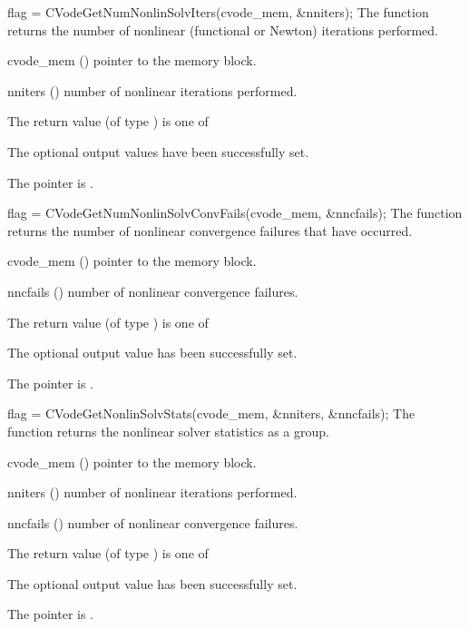 {}
{
  flag = CVodeGetNumNonlinSolvIters(cvode\_mem, \&nniters);
}
{
  The function  returns the
  number of nonlinear (functional or Newton) iterations performed. 
}
{
  \begin{args}
  \item[cvode\_mem] ()
    pointer to the {\cvodes} memory block.
  \item[nniters] ()
    number of nonlinear iterations performed.
  \end{args}
}
{
  The return value  (of type ) is one of
  \begin{args}
  \item[\Id{CV\_SUCCESS}] 
    The optional output values have been successfully set.
  \item[\Id{CV\_MEM\_NULL}]
    The  pointer is .
  \end{args}
}
{}
{
  flag = CVodeGetNumNonlinSolvConvFails(cvode\_mem, \&nncfails);
}
{
  The function  returns the
  number of nonlinear convergence failures that have occurred.
}
{
  \begin{args}
  \item[cvode\_mem] ()
    pointer to the {\cvodes} memory block.
  \item[nncfails] ()
    number of nonlinear convergence failures.
  \end{args}
}
{
  The return value  (of type ) is one of
  \begin{args}
  \item[\Id{CV\_SUCCESS}] 
    The optional output value has been successfully set.
  \item[\Id{CV\_MEM\_NULL}]
    The  pointer is .
  \end{args}
}
{}
{
  flag = CVodeGetNonlinSolvStats(cvode\_mem, \&nniters, \&nncfails);
}
{
  The function  returns the
  {\cvodes} nonlinear solver statistics as a group.
}
{
  \begin{args}
  \item[cvode\_mem] ()
    pointer to the {\cvodes} memory block.
  \item[nniters] ()
    number of nonlinear iterations performed.
  \item[nncfails] ()
    number of nonlinear convergence failures.
  \end{args}
}
{
  The return value  (of type ) is one of
  \begin{args}
  \item[\Id{CV\_SUCCESS}] 
    The optional output value has been successfully set.
  \item[\Id{CV\_MEM\_NULL}]
    The  pointer is .
  \end{args}
}
{}

